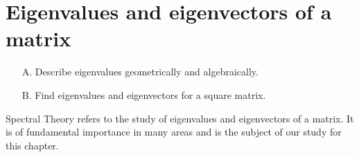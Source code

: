 \section{Eigenvalues and eigenvectors of a matrix}

\begin{outcome}
\begin{enumerate}
\item[A.] Describe eigenvalues geometrically and algebraically.

\item[B.] Find eigenvalues and eigenvectors for a square matrix.
\end{enumerate}
\end{outcome}

Spectral Theory refers to the study of eigenvalues and eigenvectors of a
matrix. It is of fundamental importance in many areas and is the subject of our study 
for this chapter.